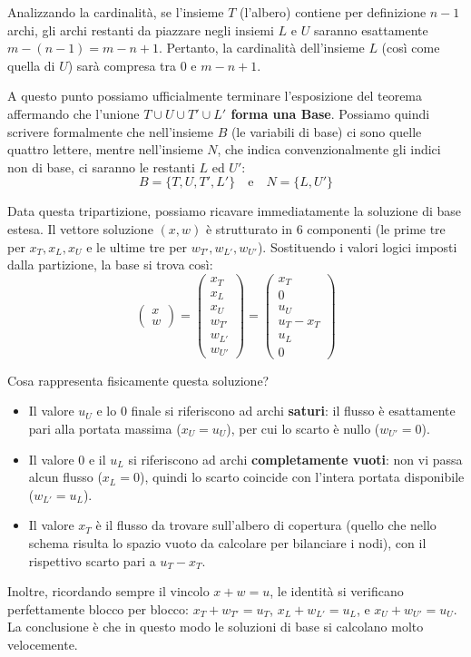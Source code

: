 \documentclass[12pt, a4paper]{article}
\begin{document}
	Analizzando la cardinalità, se l'insieme $T$ (l'albero) contiene per definizione $n-1$ archi, gli archi restanti da piazzare negli insiemi $L$ e $U$ saranno esattamente $m - (n - 1) = m - n + 1$. Pertanto, la cardinalità dell'insieme $L$ (così come quella di $U$) sarà compresa tra $0$ e $m - n + 1$.
	
	A questo punto possiamo ufficialmente terminare l'esposizione del teorema affermando che l'unione \textbf{$T \cup U \cup T' \cup L'$ forma una Base}. 
	Possiamo quindi scrivere formalmente che nell'insieme $B$ (le variabili di base) ci sono quelle quattro lettere, mentre nell'insieme $N$, che indica convenzionalmente gli indici non di base, ci saranno le restanti $L$ ed $U'$:
	\[ B = \{T, U, T', L'\} \quad \text{e} \quad N = \{L, U'\} \]
	
	Data questa tripartizione, possiamo ricavare immediatamente la soluzione di base estesa. Il vettore soluzione $(x, w)$ è strutturato in 6 componenti (le prime tre per $x_T, x_L, x_U$ e le ultime tre per $w_{T'}, w_{L'}, w_{U'}$). Sostituendo i valori logici imposti dalla partizione, la base si trova così:
	\[ 
	\begin{pmatrix} x \\ w \end{pmatrix} = 
	\begin{pmatrix} x_T \\ x_L \\ x_U \\ w_{T'} \\ w_{L'} \\ w_{U'} \end{pmatrix} = 
	\begin{pmatrix} x_T \\ 0 \\ u_U \\ u_T - x_T \\ u_L \\ 0 \end{pmatrix} 
	\]
	
	Cosa rappresenta fisicamente questa soluzione?
	\begin{itemize}[label=$\circ$, itemsep=2pt, leftmargin=1.5cm]
		\item Il valore \textbf{$u_U$} e lo \textbf{$0$} finale si riferiscono ad archi \textbf{saturi}: il flusso è esattamente pari alla portata massima ($x_U = u_U$), per cui lo scarto è nullo ($w_{U'} = 0$).
		\item Il valore \textbf{$0$} e il \textbf{$u_L$} si riferiscono ad archi \textbf{completamente vuoti}: non vi passa alcun flusso ($x_L = 0$), quindi lo scarto coincide con l'intera portata disponibile ($w_{L'} = u_L$).
		\item Il valore \textbf{$x_T$} è il flusso da trovare sull'albero di copertura (quello che nello schema risulta lo spazio vuoto da calcolare per bilanciare i nodi), con il rispettivo scarto pari a \textbf{$u_T - x_T$}.
	\end{itemize}
	Inoltre, ricordando sempre il vincolo $x + w = u$, le identità si verificano perfettamente blocco per blocco: $x_T + w_{T'} = u_T$, $x_L + w_{L'} = u_L$, e $x_U + w_{U'} = u_U$. La conclusione è che in questo modo le soluzioni di base si calcolano molto velocemente.
	
\end{document}
